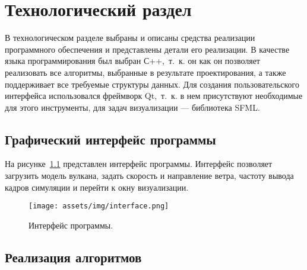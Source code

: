 \chapter{Технологический раздел}

В технологическом разделе выбраны и описаны средства реализации программного обеспечения и представлены детали его реализации.
В качестве языка программирования был выбран С++,~т.~к. он 
как он позволяет реализовать все алгоритмы, выбранные в результате проектирования, а также поддерживает все требуемые структуры данных. Для создания пользовательского интерфейса использовался фреймворк Qt,~т.~к. в нем присутствуют необходимые для этого инструменты, для задач визуализации --- библиотека SFML.

\section{Графический интерфейс программы}
На рисунке~\ref{fig:interface} представлен интерфейс программы. Интерфейс позволяет загрузить модель вулкана, задать скорость и направление ветра, частоту вывода кадров симуляции и перейти к окну визуализации. 

\begin{figure}[H]
	\centering
	\texttt{[image: assets/img/interface.png]}   
	\caption{Интерфейс программы.}
	\label{fig:interface}
\end{figure}
\section{Реализация алгоритмов}

